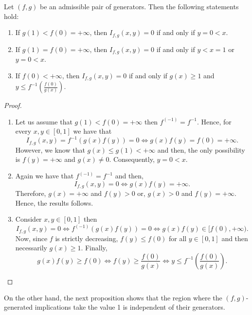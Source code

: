 \begin{proposition} Let $(f,g)$ be an admissible pair of generators. Then the following statements hold:
	\begin{enumerate}[label=(\roman*)]
		\item If $g(1) < f(0) = + \infty$, then $I_{f,g}(x,y)=0$ if and only if $y=0<x$.
		\item If $g(1)=f(0)= + \infty$, then $I_{f,g}(x,y)=0$ if and only if $y<x=1$ or $y=0<x$.
		\item If $f(0)< + \infty$, then $I_{f,g}(x,y)= 0$ if and only if $g(x) \geq 1$ and $ y \leq f^{-1}\left(\frac{f(0)}{g(x)}\right)$.
	\end{enumerate}
\end{proposition}
\begin{proof} \hspace{0.5cm}
	\begin{enumerate}[label=(\roman*)]
		\item Let us assume that $g(1)<f(0)= + \infty$ then $f^{(-1)}=f^{-1}$. Hence, for every $x,y \in [0,1]$ we have that 
		$$I_{f,g}(x,y)=f^{-1}(g(x)f(y))=0 \Leftrightarrow g(x)f(y)=f(0)=+\infty.$$
		However, we know that $g(x) \leq g(1) < + \infty$ and then, the only possibility is $f(y)=+\infty$ and $g(x) \not = 0$. Consequently, $y=0<x$.
		\item Again we have that $f^{(-1)}=f^{-1}$ and then,
		$$I_{f,g}(x,y)=0 \Leftrightarrow g(x)f(y)= + \infty.$$
		Therefore, $g(x)=+ \infty$ and $f(y)>0$ or, $g(x)>0$ and $f(y)=+\infty$. Hence, the results follows.
		\item Consider $x,y \in [0,1]$ then
		$$I_{f,g}(x,y)=0 \Leftrightarrow f^{(-1)}(g(x)f(y))=0 \Leftrightarrow g(x)f(y) \in [f(0), + \infty).$$
		Now, since $f$ is strictly decreasing, $f(y) \leq f(0)$ for all $ y \in [0,1]$ and then necessarily $g(x) \geq 1$. Finally,
		$$g(x)f(y)\geq f(0) \Leftrightarrow f(y) \geq \frac{f(0)}{g(x)} \Leftrightarrow y \leq f^{-1}\left(\frac{f(0)}{g(x)}\right).$$
	\end{enumerate}
\end{proof}


On the other hand, the next proposition shows that the region where the $(f,g)$-generated implications take the value 1 is independent of their generators.

